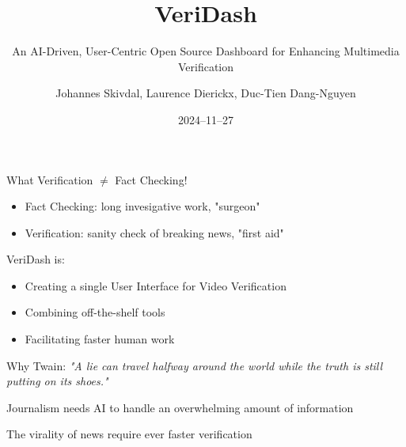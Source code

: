 \documentclass{beamer}
\title{VeriDash}
\subtitle{An AI-Driven, User-Centric Open Source Dashboard for Enhancing Multimedia Verification}
\date{2024--11--27}
\author{Johannes Skivdal, Laurence Dierickx, Duc-Tien Dang-Nguyen}
\institute{University of Bergen, Norway}
\begin{document}
  \begin{frame}
    \maketitle

  \end{frame}

  \begin{frame}{What}
    Verification $\neq$ Fact Checking!
    \begin{itemize}
      \item Fact Checking: long invesigative work, "surgeon"  %
      \item Verification: sanity check of breaking news, "first aid"
    \end{itemize}

    VeriDash is:
    \begin{itemize}
      \item Creating a single User Interface for Video Verification
      \item Combining off-the-shelf tools
      \item Facilitating faster human work
    \end{itemize}
  \end{frame}

  \begin{frame}{Why}
    Twain: \textit{"A lie can travel halfway around the world while the truth is still putting on its shoes."}

    Journalism needs AI to handle an overwhelming amount of information

    The virality of news require ever faster verification
  \end{frame}
\end{document}
